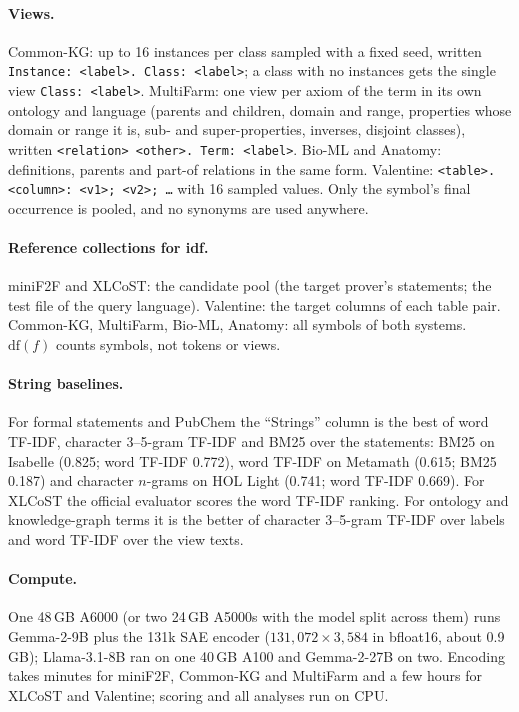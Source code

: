 \documentclass[11pt]{article}
\newcommand{\df}{\mathrm{df}}
\begin{document}
\paragraph{Views.}
Common-KG: up to 16 instances per class sampled with a fixed seed, written \texttt{Instance: <label>. Class: <label>}; a class with no instances gets the single view \texttt{Class: <label>}.
MultiFarm: one view per axiom of the term in its own ontology and language (parents and children, domain and range, properties whose domain or range it is, sub- and super-properties, inverses, disjoint classes), written \texttt{<relation> <other>. Term: <label>}.
Bio-ML and Anatomy: definitions, parents and part-of relations in the same form.
Valentine: \texttt{<table>.<column>: <v1>; <v2>; \dots} with 16 sampled values.
Only the symbol's final occurrence is pooled, and no synonyms are used anywhere.

\paragraph{Reference collections for idf.}
miniF2F and XLCoST: the candidate pool (the target prover's statements; the test file of the query language).
Valentine: the target columns of each table pair.
Common-KG, MultiFarm, Bio-ML, Anatomy: all symbols of both systems.
$\df(f)$ counts symbols, not tokens or views.

\paragraph{String baselines.}
For formal statements and PubChem the ``Strings'' column is the best of word TF-IDF, character 3--5-gram TF-IDF and BM25 over the statements: BM25 on Isabelle (0.825; word TF-IDF 0.772), word TF-IDF on Metamath (0.615; BM25 0.187) and character $n$-grams on HOL Light (0.741; word TF-IDF 0.669).
For XLCoST the official evaluator scores the word TF-IDF ranking.
For ontology and knowledge-graph terms it is the better of character 3--5-gram TF-IDF over labels and word TF-IDF over the view texts.

\paragraph{Compute.}
One 48\,GB A6000 (or two 24\,GB A5000s with the model split across them) runs Gemma-2-9B plus the 131k SAE encoder ($131{,}072\times 3{,}584$ in bfloat16, about 0.9\,GB); Llama-3.1-8B ran on one 40\,GB A100 and Gemma-2-27B on two.
Encoding takes minutes for miniF2F, Common-KG and MultiFarm and a few hours for XLCoST and Valentine; scoring and all analyses run on CPU.
\end{document}
